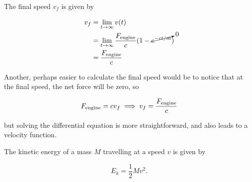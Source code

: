 \documentclass{homework}
\begin{document}
The final speed $v_f$ is given by

\begin{align*}
    v_f &= \lim_{t \to \infty} v(t) \\
    &= \lim_{t \to \infty} \frac{F_{\text{engine}}}{c} (1 - \cancelto{0}{e^{-ct / m}}) \\
    &= \frac{F_{\text{engine}}}{c}
\end{align*}

Another, perhaps easier to calculate the final speed would be to notice that at
the final speed, the net force will be zero, so

\begin{equation*}
    F_{\text{engine}} = cv_f \implies v_f = \frac{F_{\text{engine}}}{c}
\end{equation*}

but solving the differential equation is more straightforward, and also leads to a velocity function.

\exercise
The kinetic energy of a mass $M$ travelling at a speed $v$ is given by

\begin{equation*}
    E_k = \frac{1}{2}Mv^2.
\end{equation*}
\end{document}
